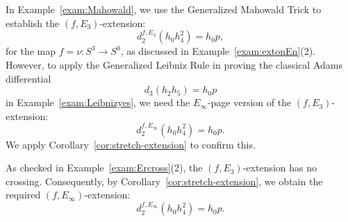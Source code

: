 \begin{example}\label{exam:stretchext}
    In Example~\ref{exam:Mahowald}, we use the Generalized Mahowald Trick to establish the $(f, E_3)$-extension:
    $$d_2^{f, E_3} (h_0h_4^2) = h_0 p,$$
    for the map $f=\nu:S^3 \rightarrow S^0$, as discussed in Example~\ref{exam:extonEn}(2). However, to apply the Generalized Leibniz Rule in proving the classical Adams differential
    $$d_3(h_2h_5) = h_0p$$
    in Example~\ref{exam:Leibnizyes}, we need the $E_\infty$-page version of the $(f, E_3)$-extension:
    $$d_2^{f, E_\infty} (h_0h_4^2) = h_0 p.$$
    We apply Corollary~\ref{cor:stretch-extension} to confirm this.

    As checked in Example~\ref{exam:Ercross}(2), the $(f, E_3)$-extension has no crossing. Consequently, by Corollary~\ref{cor:stretch-extension}, we obtain the required $(f, E_\infty)$-extension:
    $$d_2^{f, E_\infty} (h_0h_4^2) = h_0 p.$$
\end{example}


